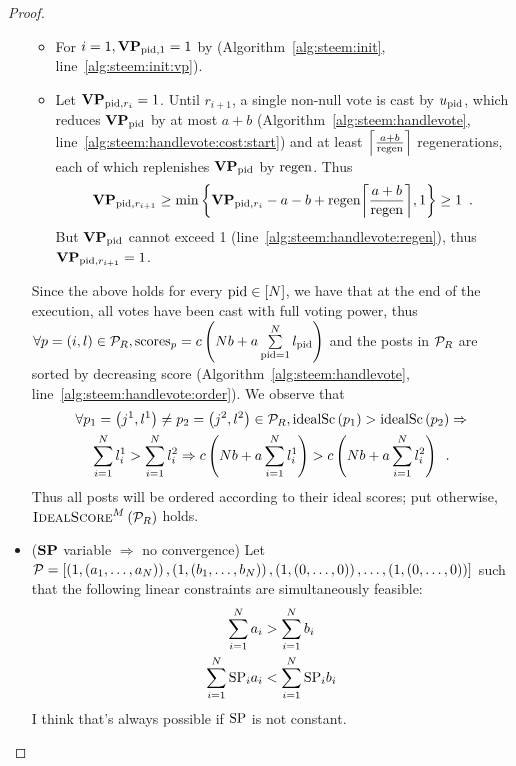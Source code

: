 \begin{proof}
\begin{itemize}
    \begin{itemize}
      \item For $i = 1, \votpowvec_{\pid, 1} = 1$ by
      (Algorithm~\ref{alg:steem:init}, line~\ref{alg:steem:init:vp}).
      \item Let $\votpowvec_{\pid, r_i} = 1$. Until $r_{i + 1}$, a single
      non-null vote is cast by $u_\pid$, which reduces $\votpowvec_{\pid}$ by at
      most $a + b$ (Algorithm~\ref{alg:steem:handlevote},
      line~\ref{alg:steem:handlevote:cost:start}) and at least $\ceil*{\frac{a +
      b}{\regen}}$ regenerations, each of which replenishes $\votpowvec_{\pid}$
      by $\regen$. Thus
      \begin{equation*}
        \votpowvec_{\pid, r_{i + 1}} \geq \min{\left\{\votpowvec_{\pid, r_i} - a
        - b + \regen\ceil*{\frac{a + b}{\regen}}, 1\right\}} \geq 1 \enspace.
      \end{equation*}
      But $\votpowvec_{\pid}$ cannot exceed 1
      (line~\ref{alg:steem:handlevote:regen}), thus $\votpowvec_{\pid, r_{i +
      1}} = 1$.
    \end{itemize}
    Since the above holds for every $\pid \in \left[\playerlen\right]$, we have
    that at the end of the execution, all votes have been cast with full voting
    power, thus $\forall \post = \left(i, \like\right) \in \postlist_\rounds,
    \mathrm{scores}_{p} = c\left(\playerlen b + a \sum\limits_{\pid =
    1}^\playerlen \like_{\pid}\right)$ and the posts in $\postlist_R$ are sorted
    by decreasing score (Algorithm~\ref{alg:steem:handlevote},
    line~\ref{alg:steem:handlevote:order}). We observe that
    \begin{gather*}
      \forall p_1 = \left(j^1, \like^1\right) \neq p_2 = \left(j^2,
      \like^2\right) \in \postlist_R, \idsc{p_1} > \idsc{p_2} \Rightarrow \\
      \sum\limits_{i = 1}^\playerlen \like^1_i > \sum\limits_{i = 1}^\playerlen
      \like^2_i \Rightarrow c\left(\playerlen b + a \sum\limits_{i =
      1}^\playerlen \like^1_i\right) > c\left(\playerlen b + a \sum\limits_{i =
      1}^\playerlen \like^2_i\right) \enspace.
    \end{gather*}
    Thus all posts will be ordered according to their ideal scores; put
    otherwise, $\textsc{IdealScore}^M\left(\postlist_\rounds\right)$ holds.

    \item ($\stpowvec$ variable $\Rightarrow$ no convergence) Let $\postlist =
    \left[\left(1, \left(a_1, \dots, a_\playerlen\right)\right), \left(1,
    \left(b_1, \dots, b_\playerlen\right)\right), \left(1, \left(0, \dots,
    0\right)\right), \dots, \left(1, \left(0, \dots, 0\right)\right)\right]$
    such that the following linear constraints are simultaneously feasible:
    \begin{gather*}
      \sum\limits_{i=1}^\playerlen a_i > \sum\limits_{i=1}^\playerlen b_i \\
      \sum\limits_{i=1}^\playerlen \stpow_i a_i < \sum\limits_{i=1}^\playerlen
      \stpow_i  b_i
    \end{gather*}
    I think that's always possible if $\stpow$ is not constant.


\end{itemize}
\end{proof}
